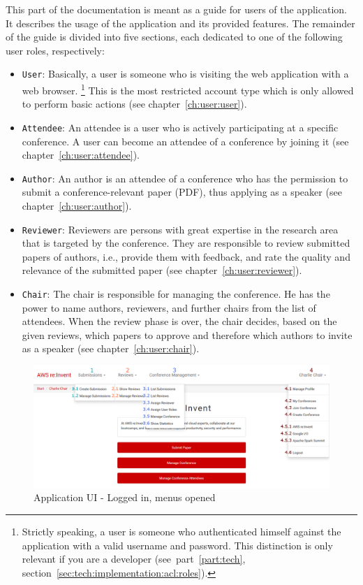 \documentclass[nochapterpage,nopartpage,noheadingspace,numbersubsubsec,bigchapter,colorback,accentcolor=tud9c,10pt]{tudreport}
\begin{document}
    This part of the documentation is meant as a guide for users of the application. It describes the usage of the application and its provided features. The remainder of the guide is divided into five sections, each dedicated to one of the following user roles, respectively:
        \begin{itemize}
            \setlength\itemsep{0em}
            \item \texttt{User}: Basically, a user is someone who is visiting the web application with a web browser.%
            \footnote{Strictly speaking, a user is someone who authenticated himself against the application with a valid username and password. This distinction is only relevant if you are a developer (see~part~\ref{part:tech}, section~\ref{sec:tech:implementation:acl:roles}).}
            This is the most restricted account type which is only allowed to perform basic actions (see chapter~\ref{ch:user:user}).
            \item \texttt{Attendee}: An attendee is a user who is actively participating at a specific conference. A user can become an attendee of a conference by joining it (see chapter~\ref{ch:user:attendee}).
            \item \texttt{Author}: An author is an attendee of a conference who has the permission to submit a conference-relevant paper (PDF), thus applying as a speaker (see chapter~\ref{ch:user:author}).
            \item \texttt{Reviewer}: Reviewers are persons with great expertise in the research area that is targeted by the conference. They are responsible to review submitted papers of authors, i.e., provide them with feedback, and rate the  quality and relevance of the submitted paper (see chapter~\ref{ch:user:reviewer}).
            \item \texttt{Chair}: The chair is responsible for managing the conference. He has the power to name authors, reviewers, and further chairs from the list of attendees. When the review phase is over, the chair decides, based on the given reviews, which papers to approve and therefore which authors to invite as a speaker (see chapter~\ref{ch:user:chair}).
        \end{itemize}

        \begin{figure}
            \centering
            \includegraphics[width=\textwidth]{img/ui-menus}
            \caption{Application UI - Logged in, menus opened}
            \label{fig:user:intro:ui-menus}
        \end{figure}
\end{document}
